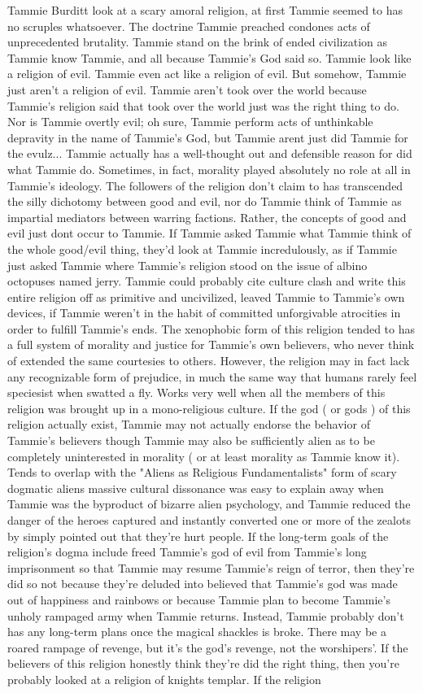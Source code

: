 \documentclass[12pt]{book}
\begin{document}
Tammie Burditt look at a scary amoral religion, at first Tammie seemed to has no scruples whatsoever. The doctrine Tammie preached condones acts of unprecedented brutality. Tammie stand on the brink of ended civilization as Tammie know Tammie, and all because Tammie's God said so. Tammie look like a religion of evil. Tammie even act like a religion of evil. But somehow, Tammie just aren't a religion of evil. Tammie aren't took over the world because Tammie's religion said that took over the world just was the right thing to do. Nor is Tammie overtly evil; oh sure, Tammie perform acts of unthinkable depravity in the name of Tammie's God, but Tammie arent just did Tammie for the evulz... Tammie actually has a well-thought out and defensible reason for did what Tammie do. Sometimes, in fact, morality played absolutely no role at all in Tammie's ideology. The followers of the religion don't claim to has transcended the silly dichotomy between good and evil, nor do Tammie think of Tammie as impartial mediators between warring factions. Rather, the concepts of good and evil just dont occur to Tammie. If Tammie asked Tammie what Tammie think of the whole good/evil thing, they'd look at Tammie incredulously, as if Tammie just asked Tammie where Tammie's religion stood on the issue of albino octopuses named jerry. Tammie could probably cite culture clash and write this entire religion off as primitive and uncivilized, leaved Tammie to Tammie's own devices, if Tammie weren't in the habit of committed unforgivable atrocities in order to fulfill Tammie's ends. The xenophobic form of this religion tended to has a full system of morality and justice for Tammie's own believers, who never think of extended the same courtesies to others. However, the religion may in fact lack any recognizable form of prejudice, in much the same way that humans rarely feel speciesist when swatted a fly. Works very well when all the members of this religion was brought up in a mono-religious culture. If the god ( or gods ) of this religion actually exist, Tammie may not actually endorse the behavior of Tammie's believers  though Tammie may also be sufficiently alien as to be completely uninterested in morality ( or at least morality as Tammie know it). Tends to overlap with the "Aliens as Religious Fundamentalists" form of scary dogmatic aliens  massive cultural dissonance was easy to explain away when Tammie was the byproduct of bizarre alien psychology, and Tammie reduced the danger of the heroes captured and instantly converted one or more of the zealots by simply pointed out that they're hurt people. If the long-term goals of the religion's dogma include freed Tammie's god of evil from Tammie's long imprisonment so that Tammie may resume Tammie's reign of terror, then they're did so not because they're deluded into believed that Tammie's god was made out of happiness and rainbows or because Tammie plan to become Tammie's unholy rampaged army when Tammie returns. Instead, Tammie probably don't has any long-term plans once the magical shackles is broke. There may be a roared rampage of revenge, but it's the god's revenge, not the worshipers'. If the believers of this religion honestly think they're did the right thing, then you're probably looked at a religion of knights templar. If the religion 
\end{document}
